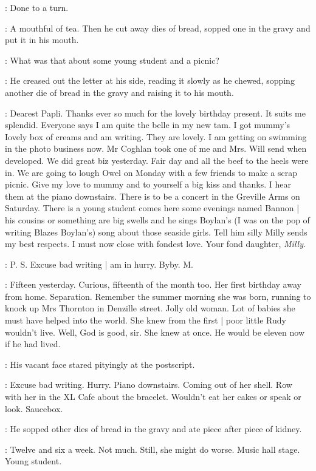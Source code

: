 \BloomInt:
Done to a turn.

:
A mouthful of tea.
Then he cut away dies of bread,
sopped one in the gravy and put it in his mouth.

\BloomInt:
What was that about some young student and a picnic?

:
He creased out the letter at his side,
reading it slowly as he chewed,
sopping another die of bread in the gravy and
raising it to his mouth.

\Milly:
Dearest Papli.
Thanks ever so much for the lovely birthday present.
It suits me splendid.
Everyone says I am quite the belle in my new tam.
I got mummy's Iovely box of creams and am writing.
They are lovely.
I am getting on swimming in the photo business now.
Mr Coghlan took one of me and Mrs.
Will send when developed.
We did great biz yesterday.
Fair day and all the beef to the heels were in.
We are going to lough Owel on Monday with a few friends to make a scrap picnic.
Give my love to mummy and to yourself a big kiss and thanks.
I hear them at the piano downstairs.
There is to be a concert in the Greville Arms on Saturday.
There is a young student comes here some evenings named Bannon |
his cousins or something are big swells
and he sings Boylan's
(I was on the pop of writing Blazes Boylan's)
song about those seaside girls.
Tell him silly Milly sends my best respects.
I must now close with fondest love.
Your fond daughter,
\emph{Milly}.

\Milly:
P. S.
Excuse bad writing |
am in hurry.
Byby.
M.

\BloomInt:
Fifteen yesterday.
Curious, fifteenth of the month too.
Her first birthday away from home.
Separation.
Remember the summer morning she was born,
running to knock up Mrs Thornton in Denzille street.
Jolly old woman.
Lot of babies she must have helped into the world.
She knew from the first |
poor little Rudy wouldn't live.
Well, God is good, sir.
She knew at once.
He would be eleven now if he had lived.

:
His vacant face stared pityingly at the postscript.

\BloomInt:
Excuse bad writing.
Hurry.
Piano downstairs.
Coming out of her shell.
Row with her in the XL
Cafe about the bracelet.
Wouldn't eat her cakes or speak or look.
Saucebox.

:
He sopped other dies of bread in the gravy
and ate piece after piece of kidney.

\BloomInt:
Twelve and six a week.
Not much.
Still, she might do worse.
Music hall stage.
Young student.

